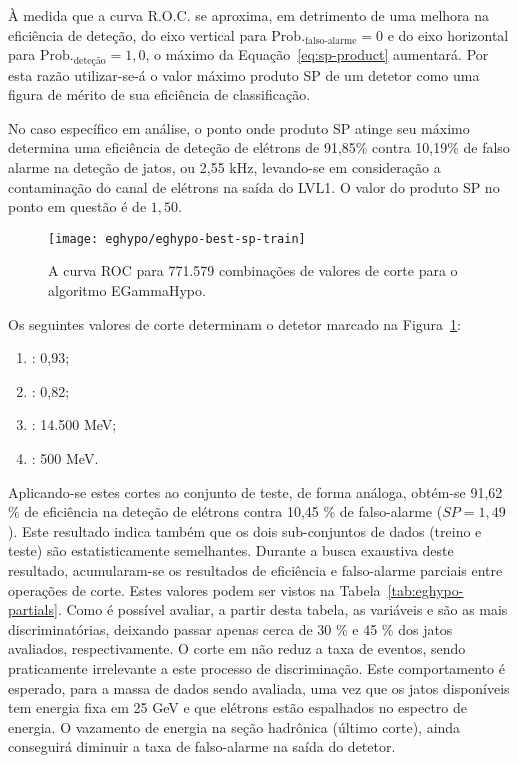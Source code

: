 À medida que a curva R.O.C. se aproxima, em detrimento de uma melhora na
eficiência de deteção, do eixo vertical para $\text{Prob.}_\text{falso-alarme}
= 0$ e do eixo horizontal para $\text{Prob.}_\text{deteção} = 1,0$, o máximo
da Equação~\ref{eq:sp-product} aumentará. Por esta razão utilizar-se-á o valor
máximo produto SP de um detetor como uma figura de mérito de sua eficiência de
classificação.

No caso específico em análise, o ponto onde produto SP atinge seu máximo
determina uma eficiência de deteção de elétrons de 91,85\% contra 10,19\% de
falso alarme na deteção de jatos, ou 2,55 kHz, levando-se em consideração a
contaminação do canal de elétrons na saída do LVL1. O valor do produto SP no
ponto em questão é de $1,50$.

\begin{figure}
\begin{center}
\texttt{[image: eghypo/eghypo-best-sp-train]}
\end{center}
\caption{A curva ROC para 771.579 combinações de valores de corte para o
algoritmo EGammaHypo.}
\label{fig:eghypo-best-sp-train}
\end{figure}

Os seguintes valores de corte determinam o detetor marcado na
Figura~\ref{fig:eghypo-best-sp-train}:
\begin{enumerate}
\item \rcore: 0,93;
\item \eratio: 0,82;
\item \etem: 14.500 MeV;
\item \ethad: 500 MeV.
\end{enumerate}

Aplicando-se estes cortes ao conjunto de teste, de forma análoga, obtém-se
91,62 \% de eficiência na deteção de elétrons contra 10,45 \% de falso-alarme
($SP = 1,49$). Este resultado indica também que os dois sub-conjuntos de dados
(treino e teste) são estatisticamente semelhantes. Durante a busca exaustiva
deste resultado, acumularam-se os resultados de eficiência e falso-alarme
parciais entre operações de corte. Estes valores podem ser vistos na
Tabela~\ref{tab:eghypo-partials}. Como é possível avaliar, a partir desta
tabela, as variáveis \rcore e \eratio são as mais discriminatórias, deixando
passar apenas cerca de 30 \% e 45 \% dos jatos avaliados, respectivamente. O
corte em \etem não reduz a taxa de eventos, sendo praticamente irrelevante a
este processo de discriminação. Este comportamento é esperado, para a massa de
dados sendo avaliada, uma vez que os jatos disponíveis tem energia fixa em 25
GeV e que elétrons estão espalhados no espectro de energia. O vazamento de
energia na seção hadrônica (último corte), ainda conseguirá diminuir a taxa de
falso-alarme na saída do detetor.

